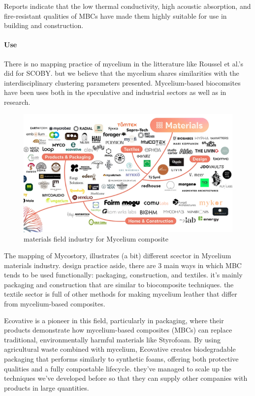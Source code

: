 Reports indicate that the low thermal conductivity, high acoustic absorption, and fire-resistant qualities of MBCs have made them highly suitable for use in building and construction. \cite{ghazvinian2019mycelium}

\paragraph{Use}

There is no mapping practice of mycelium in the litterature like Roussel et al.'s \cite{roussel2023processes} did for SCOBY. but we believe that the mycelium shares similarities with the interdisciplinary clustering parameters presented.
Mycelium-based biocomsites have been uses both in the speculative and industrial sectors as well as in research.

\begin{figure}[h]
    \centering
    \includegraphics{images/mycelium-indus-tree.png}
    \caption{materials field industry for Mycelium composite}
    \label{fig:indus-tree}
\end{figure}

The mapping of Mycostory, illustrates (a bit) different scector in Mycelium materials industry. design practice aside, there are 3 main ways in which MBC tends to be used functionally: packaging, construction, and textiles. 
it's mainly packaging and construction that are similar to biocomposite techniques. the textile sector is full of other methods for making mycelium leather that differ from mycelium-based composites. 


Ecovative is a pioneer in this field, particularly in packaging, where their products demonstrate how mycelium-based composites (MBCs) can replace traditional, environmentally harmful materials like Styrofoam. By using agricultural waste combined with mycelium, Ecovative creates biodegradable packaging that performs similarly to synthetic foams, offering both protective qualities and a fully compostable lifecycle. they've managed to scale up the techniques we've developed before so that they can supply other companies with products in large quantities. 

